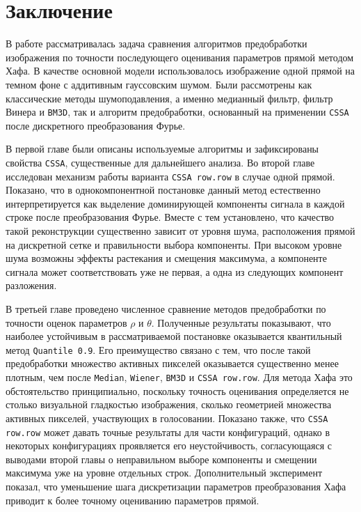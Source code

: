 \chapter*{Заключение}

В работе рассматривалась задача сравнения алгоритмов предобработки изображения
по точности последующего оценивания параметров прямой методом Хафа. В качестве
основной модели использовалось изображение одной прямой на темном фоне с
аддитивным гауссовским шумом. Были рассмотрены как классические методы
шумоподавления, а именно медианный фильтр, фильтр Винера и \texttt{BM3D}, так и
алгоритм предобработки, основанный на применении \texttt{CSSA} после
дискретного преобразования Фурье.

В первой главе были описаны используемые алгоритмы и зафиксированы свойства
\texttt{CSSA}, существенные для дальнейшего анализа. Во второй главе
исследован механизм работы варианта \texttt{CSSA row.row} в случае одной прямой.
Показано, что в однокомпонентной постановке данный метод естественно
интерпретируется как выделение доминирующей компоненты сигнала в каждой строке
после преобразования Фурье. Вместе с тем установлено, что качество такой
реконструкции существенно зависит от уровня шума, расположения прямой на
дискретной сетке и правильности выбора компоненты. При высоком уровне шума
возможны эффекты растекания и смещения максимума, а компоненте сигнала может
соответствовать уже не первая, а одна из следующих компонент разложения.

В третьей главе проведено численное сравнение методов предобработки по точности
оценок параметров $\rho$ и $\theta$. Полученные результаты показывают, что
наиболее устойчивым в рассматриваемой постановке оказывается квантильный метод
\texttt{Quantile 0.9}. Его преимущество связано с тем, что после такой
предобработки множество активных пикселей оказывается существенно менее
плотным, чем после \texttt{Median}, \texttt{Wiener}, \texttt{BM3D} и
\texttt{CSSA row.row}. Для метода Хафа это обстоятельство принципиально,
поскольку точность оценивания определяется не столько визуальной гладкостью
изображения, сколько геометрией множества активных пикселей, участвующих в
голосовании. Показано также, что \texttt{CSSA row.row} может давать точные
результаты для части конфигураций, однако в некоторых конфигурациях
проявляется его неустойчивость, согласующаяся с выводами второй главы о
неправильном выборе компоненты и смещении максимума уже на уровне отдельных
строк. Дополнительный эксперимент показал, что уменьшение шага дискретизации
параметров преобразования Хафа приводит к более точному оцениванию параметров
прямой.

